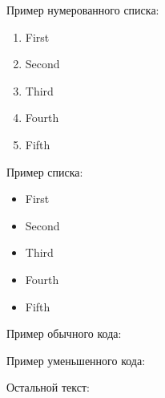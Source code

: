 \documentclass[a4paper, 14pt]{extarticle}
\begin{document}

Пример нумерованного списка: \par
\begin{enumerate}
    \item First
    \item Second
    \item Third
    \item Fourth
    \item Fifth
\end{enumerate}


Пример списка: \par
\begin{itemize}
    \item First
    \item Second
    \item Third
    \item Fourth
    \item Fifth
\end{itemize}


Пример обычного кода: \par
{}

Пример уменьшенного кода: \par
{}

Остальной текст: \par
\lipsum[1-150]
\end{document}

